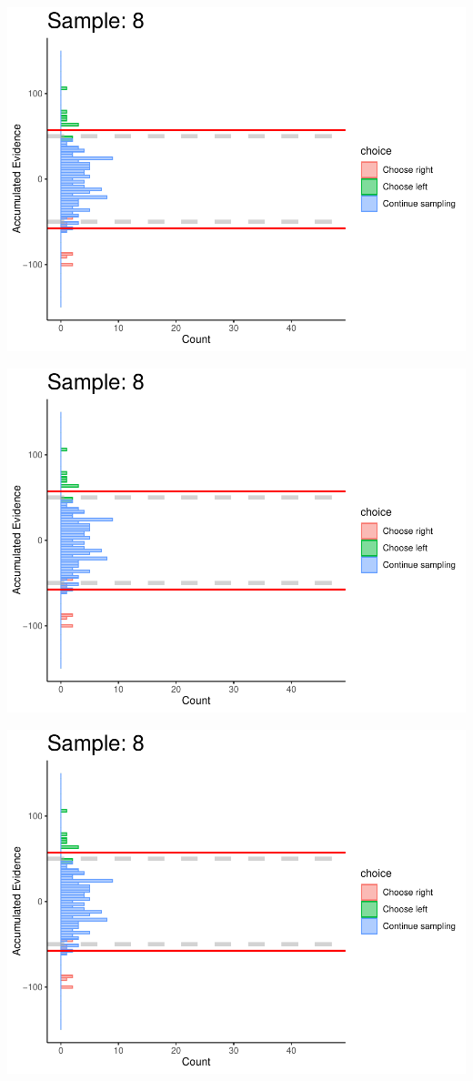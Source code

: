 \documentclass[
]{book}
\begin{document}
\begin{center}\includegraphics[width=0.8\linewidth]{LateNightBayes_files/figure-latex/fixed_dcb-70} \end{center}

\begin{center}\includegraphics[width=0.8\linewidth]{LateNightBayes_files/figure-latex/fixed_dcb-71} \end{center}

\begin{center}\includegraphics[width=0.8\linewidth]{LateNightBayes_files/figure-latex/fixed_dcb-72} \end{center}
\end{document}
